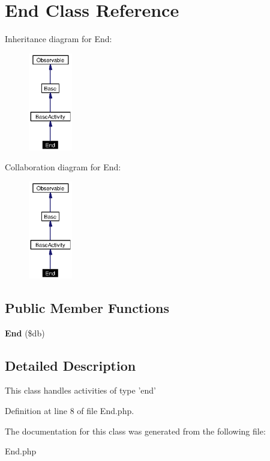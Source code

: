 \section{End Class Reference}
\label{classEnd}
Inheritance diagram for End:\begin{figure}[H]
\begin{center}
\leavevmode
\includegraphics[width=54pt]{classEnd__inherit__graph}
\end{center}
\end{figure}
Collaboration diagram for End:\begin{figure}[H]
\begin{center}
\leavevmode
\includegraphics[width=54pt]{classEnd__coll__graph}
\end{center}
\end{figure}
\subsection*{Public Member Functions}
\begin{CompactItemize}
\item 
{\bf End} (\$db)\label{classEnd_a0}

\end{CompactItemize}


\subsection{Detailed Description}
This class handles activities of type 'end' 



Definition at line 8 of file End.php.

The documentation for this class was generated from the following file:\begin{CompactItemize}
\item 
End.php\end{CompactItemize}
